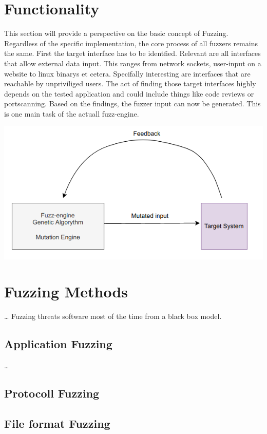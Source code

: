 \documentclass[journal=tosc,final]{iacrtrans}
\begin{document}
\section{Functionality}
This section will provide a perspective on the basic concept of Fuzzing. Regardless of the specific implementation, the core process of all fuzzers remains the same. First the target interface has to be identfied. Relevant are all interfaces that allow external data input. This ranges from network sockets, user-input on a website to linux binarys et cetera. Specifally interesting are interfaces that are reachable by unpriviliged users. The act of finding those target interfaces highly depends on the tested application and could include things like code reviews or portscanning. Based on the findings, the fuzzer input can now be generated. This is one main task of the actuall fuzz-engine. 
\begin{center}
 \includegraphics[scale=0.5]{../fuzzer.png}
\end{center}

\newpage
\section{Fuzzing Methods}
\dots
Fuzzing threats software most of the time from a black box model. 

\subsection{Application Fuzzing}
\dots
\subsection{Protocoll Fuzzing}
\subsection{File format Fuzzing}
\end{document}
